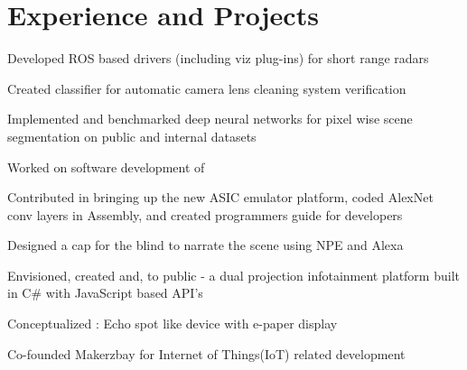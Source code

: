 \documentclass[]{resume-openfont}
\begin{document}
\begin{minipage}[t]{0.63\textwidth} 


\section{Experience and Projects}

\vspace{\topsep} %
\begin{tightemize}
\item Developed ROS based drivers (including viz plug-ins) for short range radars 
\item Created classifier for automatic camera lens cleaning system verification
\item Implemented and benchmarked deep neural networks for pixel wise scene segmentation on public and internal datasets

\end{tightemize}
\sectionsep

\begin{tightemize}
\item  Worked on software development of  \href{https://developer.qualcomm.com/software/snapdragon-neural-processing-engine}{}
\item Contributed in bringing up the new ASIC emulator platform, coded AlexNet conv layers in Assembly, and created programmers guide  for developers
\item Designed a cap for the blind to narrate the scene using NPE and Alexa

\end{tightemize}
\sectionsep

\begin{tightemize}
\item Envisioned, created and, \href{https://github.com/Microsoft/kinect-ripple}{} to public \href{https://www.youtube.com/watch?v=_0K4iZdMjLw}{} - a dual projection infotainment platform built in C\# with JavaScript based API's
\item Conceptualized \href{http://www.tusharchugh.com/works/orientron/}{} : Echo spot like device with e-paper display 
\item Co-founded Makerzbay for Internet of Things(IoT) related development 
\end{tightemize}
\sectionsep


\end{minipage}
\end{document}
